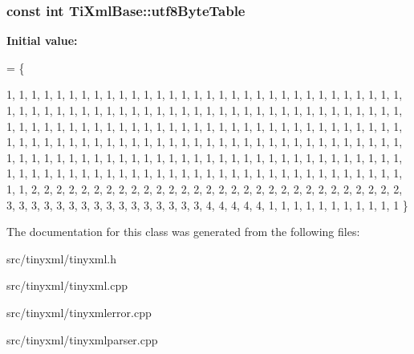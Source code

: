 \subsubsection[{\texorpdfstring{utf8\+Byte\+Table}{utf8ByteTable}}]{\setlength{\rightskip}{0pt plus 5cm}const int Ti\+Xml\+Base\+::utf8\+Byte\+Table\hspace{0.3cm}{\ttfamily [static]}}\hypertarget{classTiXmlBase_ac8c86058137bdb4b413c3eca58f2d467}{}\label{classTiXmlBase_ac8c86058137bdb4b413c3eca58f2d467}
{\bfseries Initial value\+:}
\begin{DoxyCode}
= 
\{
    
        1,  1,  1,  1,  1,  1,  1,  1,  1,  1,  1,  1,  1,  1,  1,  1,  
        1,  1,  1,  1,  1,  1,  1,  1,  1,  1,  1,  1,  1,  1,  1,  1,  
        1,  1,  1,  1,  1,  1,  1,  1,  1,  1,  1,  1,  1,  1,  1,  1,  
        1,  1,  1,  1,  1,  1,  1,  1,  1,  1,  1,  1,  1,  1,  1,  1,  
        1,  1,  1,  1,  1,  1,  1,  1,  1,  1,  1,  1,  1,  1,  1,  1,  
        1,  1,  1,  1,  1,  1,  1,  1,  1,  1,  1,  1,  1,  1,  1,  1,  
        1,  1,  1,  1,  1,  1,  1,  1,  1,  1,  1,  1,  1,  1,  1,  1,  
        1,  1,  1,  1,  1,  1,  1,  1,  1,  1,  1,  1,  1,  1,  1,  1,  
        1,  1,  1,  1,  1,  1,  1,  1,  1,  1,  1,  1,  1,  1,  1,  1,  
        1,  1,  1,  1,  1,  1,  1,  1,  1,  1,  1,  1,  1,  1,  1,  1,  
        1,  1,  1,  1,  1,  1,  1,  1,  1,  1,  1,  1,  1,  1,  1,  1,  
        1,  1,  1,  1,  1,  1,  1,  1,  1,  1,  1,  1,  1,  1,  1,  1,  
        1,  1,  2,  2,  2,  2,  2,  2,  2,  2,  2,  2,  2,  2,  2,  2,  
        2,  2,  2,  2,  2,  2,  2,  2,  2,  2,  2,  2,  2,  2,  2,  2,  
        3,  3,  3,  3,  3,  3,  3,  3,  3,  3,  3,  3,  3,  3,  3,  3,  
        4,  4,  4,  4,  4,  1,  1,  1,  1,  1,  1,  1,  1,  1,  1,  1   
\}
\end{DoxyCode}


The documentation for this class was generated from the following files\+:\begin{DoxyCompactItemize}
\item 
src/tinyxml/tinyxml.\+h\item 
src/tinyxml/tinyxml.\+cpp\item 
src/tinyxml/tinyxmlerror.\+cpp\item 
src/tinyxml/tinyxmlparser.\+cpp\end{DoxyCompactItemize}
